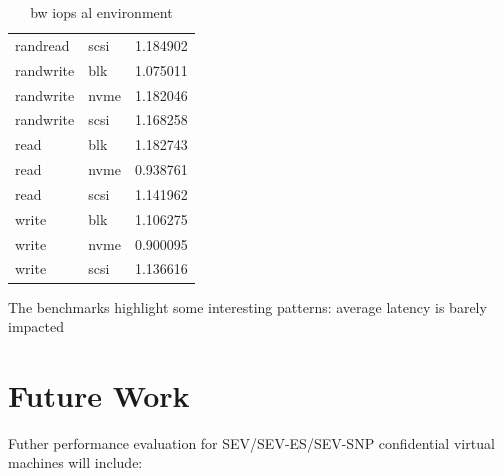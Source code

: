 \documentclass[twocolumn]{article}
\begin{document}
\begin{table}
\begin{tabular}{llr}
            randread  & scsi & 1.184902 \\
            randwrite & blk  & 1.075011 \\
            randwrite & nvme & 1.182046 \\
            randwrite & scsi & 1.168258 \\
            read      & blk  & 1.182743 \\
            read      & nvme & 0.938761 \\
            read      & scsi & 1.141962 \\
            write     & blk  & 1.106275 \\
            write     & nvme & 0.900095 \\
            write     & scsi & 1.136616 \\
            \hline
        \end{tabular}
        \caption{bw iops al environment}
    \end{table}

    The benchmarks highlight some interesting patterns: average latency is barely impacted

    \section{Future Work}
        Futher performance evaluation for SEV/SEV-ES/SEV-SNP confidential virtual machines will include:
\end{document}
